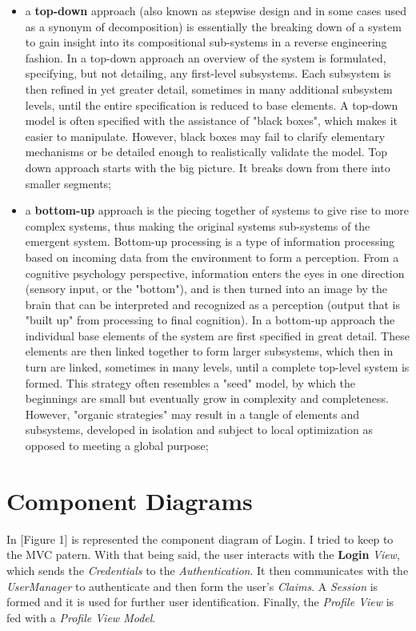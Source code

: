 \documentclass{article}
\begin{document}
			\begin{itemize}
				\item a \textbf{top-down} approach (also known as stepwise design and in some cases used as a synonym of decomposition) is essentially the breaking down of a system to gain insight into its compositional sub-systems in a reverse engineering fashion. In a top-down approach an overview of the system is formulated, specifying, but not detailing, any first-level subsystems. Each subsystem is then refined in yet greater detail, sometimes in many additional subsystem levels, until the entire specification is reduced to base elements. A top-down model is often specified with the assistance of "black boxes", which makes it easier to manipulate. However, black boxes may fail to clarify elementary mechanisms or be detailed enough to realistically validate the model. Top down approach starts with the big picture. It breaks down from there into smaller segments;

				\item a \textbf{bottom-up} approach is the piecing together of systems to give rise to more complex systems, thus making the original systems sub-systems of the emergent system. Bottom-up processing is a type of information processing based on incoming data from the environment to form a perception. From a cognitive psychology perspective, information enters the eyes in one direction (sensory input, or the "bottom"), and is then turned into an image by the brain that can be interpreted and recognized as a perception (output that is "built up" from processing to final cognition). In a bottom-up approach the individual base elements of the system are first specified in great detail. These elements are then linked together to form larger subsystems, which then in turn are linked, sometimes in many levels, until a complete top-level system is formed. This strategy often resembles a "seed" model, by which the beginnings are small but eventually grow in complexity and completeness. However, "organic strategies" may result in a tangle of elements and subsystems, developed in isolation and subject to local optimization as opposed to meeting a global purpose;
			\end{itemize}

	\section{Component Diagrams}
		In [Figure 1] is represented the component diagram of Login. I tried to keep to the MVC patern. With that being said, the user interacts with the \textbf{Login} \textit{View}, which sends the \textit{Credentials} to the \textit{Authentication}. It then communicates with the \textit{UserManager} to authenticate and then form the user's \textit{Claims}. A \textit{Session} is formed and it is used for further user identification. Finally, the \textit{Profile View} is fed with a \textit{Profile View Model}.
\end{document}

